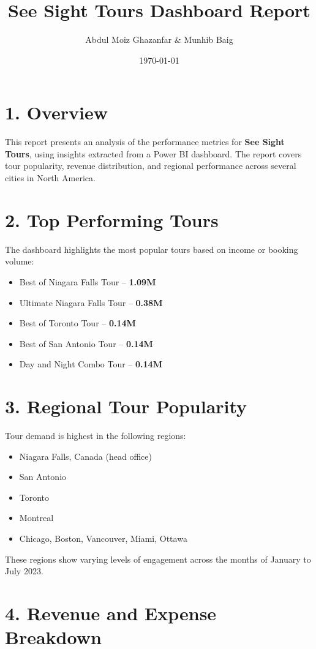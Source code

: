 \documentclass[12pt]{article}
\title{See Sight Tours Dashboard Report}
\author{Abdul Moiz Ghazanfar \& Munhib Baig}
\date{\today}
\begin{document}
\maketitle

\section*{1. Overview}
This report presents an analysis of the performance metrics for \textbf{See Sight Tours}, using insights extracted from a Power BI dashboard. The report covers tour popularity, revenue distribution, and regional performance across several cities in North America.

\section*{2. Top Performing Tours}
The dashboard highlights the most popular tours based on income or booking volume:
\begin{itemize}
    \item Best of Niagara Falls Tour – \textbf{1.09M}
    \item Ultimate Niagara Falls Tour – \textbf{0.38M}
    \item Best of Toronto Tour – \textbf{0.14M}
    \item Best of San Antonio Tour – \textbf{0.14M}
    \item Day and Night Combo Tour – \textbf{0.14M}
\end{itemize}

\section*{3. Regional Tour Popularity}
Tour demand is highest in the following regions:
\begin{itemize}
    \item Niagara Falls, Canada (head office)
    \item San Antonio
    \item Toronto
    \item Montreal
    \item Chicago, Boston, Vancouver, Miami, Ottawa
\end{itemize}
These regions show varying levels of engagement across the months of January to July 2023.

\section*{4. Revenue and Expense Breakdown}
\end{document}
